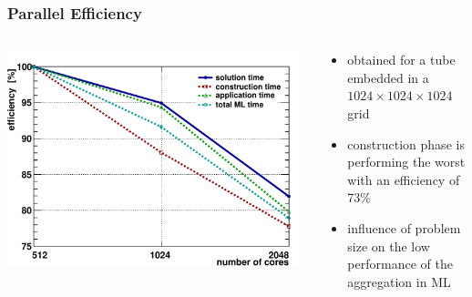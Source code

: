 \documentclass[xcolor=pdftex,table,10pt]{beamer}
\begin{document}

	\begin{frame}
		\frametitle{Parallel Efficiency}
		
		\begin{columns}
		\begin{column}{6.5cm}
            \centering
		        \includegraphics[width=0.99\textwidth]{plots/eff_1024_lin-crop.pdf}
        \end{column}
        \begin{column}{4.5cm}
            \begin{itemize} 
                \item obtained for a tube embedded in a $1024\times1024\times1024$ grid
                \item construction phase is performing the worst with an efficiency of 73\%
                \item influence of problem size on the low performance of the aggregation in ML
            \end{itemize}
        \end{column}
        \end{columns}

	\end{frame}
	
\end{document}
